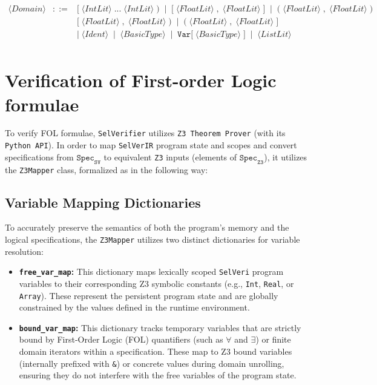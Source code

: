 \documentclass{article}
\begin{document}
\[\begin{array}{rcl}
\langle \mathit{Domain} \rangle
&::=&
\mathtt{[}\; \langle \mathit{IntLit} \rangle \; \mathtt{...}\; \langle \mathit{IntLit} \rangle \; \mathtt{)}
\;\mid\;
\mathtt{[}\; \langle \mathit{FloatLit} \rangle \; \mathtt{,}\; \langle \mathit{FloatLit} \rangle \; \mathtt{]}
\;\mid\;
\mathtt{(}\; \langle \mathit{FloatLit} \rangle \; \mathtt{,}\; \langle \mathit{FloatLit} \rangle \; \mathtt{)} \\[2pt]
&&
\mathtt{[}\; \langle \mathit{FloatLit} \rangle \; \mathtt{,}\; \langle \mathit{FloatLit} \rangle \; \mathtt{)}
\;\mid\;
\mathtt{(}\; \langle \mathit{FloatLit} \rangle \; \mathtt{,}\; \langle \mathit{FloatLit} \rangle \; \mathtt{]} \\[2pt]
&&
\mid\;
\langle \mathit{Ident} \rangle
\;\mid\;
\langle \mathit{BasicType} \rangle
\;\mid\;
\mathtt{Var[} \; \langle \mathit{BasicType} \rangle \; \mathtt{]}
\;\mid\;
\langle \mathit{ListLit} \rangle \\[4pt]
\end{array}
\]

\newpage
\section{Verification of First-order Logic formulae}
To verify FOL formulae, \texttt{SelVerifier} utilizes \texttt{Z3 Theorem Prover} (with its \texttt{Python API}). In order to map \texttt{SelVerIR} program state and scopes and convert specifications from $\mathtt{Spec}_{\mathtt{SV}}$ to equivalent \texttt{Z3} inputs (elements of $\mathtt{Spec}_{\mathtt{Z3}}$), it utilizes the \texttt{Z3Mapper} class, formalized as in the following way:

\subsection{Variable Mapping Dictionaries}
To accurately preserve the semantics of both the program's memory and the logical specifications, the \texttt{Z3Mapper} utilizes two distinct dictionaries for variable resolution:

\begin{itemize}
    \item \textbf{\texttt{free\_var\_map}:} This dictionary maps lexically scoped \texttt{SelVeri} program variables to their corresponding Z3 symbolic constants (e.g., \texttt{Int}, \texttt{Real}, or \texttt{Array}). These represent the persistent program state and are globally constrained by the values defined in the runtime environment.
    
    \item \textbf{\texttt{bound\_var\_map}:} This dictionary tracks temporary variables that are strictly bound by First-Order Logic (FOL) quantifiers (such as $\forall$ and $\exists$) or finite domain iterators within a specification. These map to Z3 bound variables (internally prefixed with \texttt{\&}) or concrete values during domain unrolling, ensuring they do not interfere with the free variables of the program state.
\end{itemize}
\end{document}
